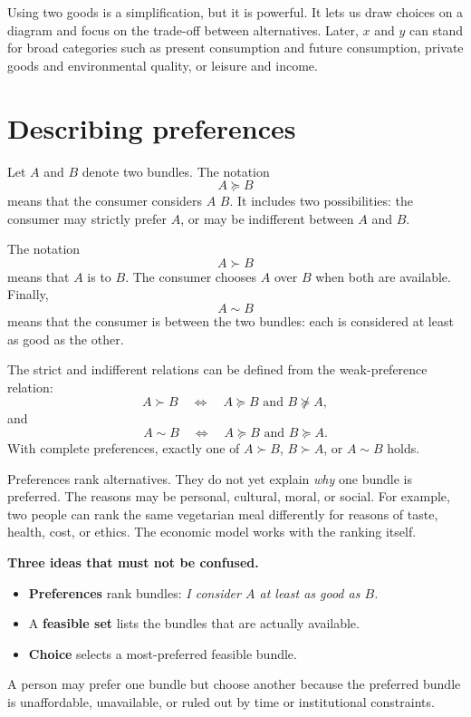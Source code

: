 Using two goods is a simplification, but it is powerful. It lets us draw
choices on a diagram and focus on the trade-off between alternatives. Later,
$x$ and $y$ can stand for broad categories such as present consumption and
future consumption, private goods and environmental quality, or leisure and
income.

\section{Describing preferences}

Let $A$ and $B$ denote two bundles. The notation
\[
A\succeq B
\]
means that the consumer considers $A$  $B$. It includes two possibilities: the consumer may strictly prefer $A$, or may be indifferent between $A$ and $B$.

The notation
\[
A\succ B
\]
means that $A$ is  to $B$. The consumer chooses $A$ over $B$ when both are available. Finally,
\[
A\sim B
\]
means that the consumer is  between the two bundles: each is considered at least as good as the other.

The strict and indifferent relations can be defined from the weak-preference
relation:
\[
A\succ B
\quad\Longleftrightarrow\quad
A\succeq B \text{ and } B\not\succeq A,
\]
and
\[
A\sim B
\quad\Longleftrightarrow\quad
A\succeq B \text{ and } B\succeq A.
\]
With complete preferences, exactly one of $A\succ B$, $B\succ A$, or
$A\sim B$ holds.

Preferences rank alternatives. They do not yet explain \emph{why} one bundle
is preferred. The reasons may be personal, cultural, moral, or social. For
example, two people can rank the same vegetarian meal differently for reasons
of taste, health, cost, or ethics. The economic model works with the ranking
itself.

\begin{keyidea}
\textbf{Three ideas that must not be confused.}
\begin{itemize}
  \item \textbf{Preferences} rank bundles: \emph{I consider $A$ at least as good as $B$.}
  \item A \textbf{feasible set} lists the bundles that are actually available.
  \item \textbf{Choice} selects a most-preferred feasible bundle.
\end{itemize}
A person may prefer one bundle but choose another because the preferred bundle
is unaffordable, unavailable, or ruled out by time or institutional
constraints.
\end{keyidea}

